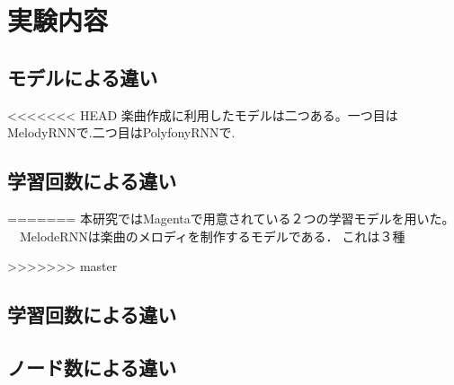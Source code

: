 \chapter{実験内容}
\section{モデルによる違い}
<<<<<<< HEAD
楽曲作成に利用したモデルは二つある。一つ目はMelodyRNNで.二つ目はPolyfonyRNNで.
\section{学習回数による違い}
=======
本研究ではMagentaで用意されている２つの学習モデルを用いた。
　MelodeRNNは楽曲のメロディを制作するモデルである．これは３種


>>>>>>> master




\section{学習回数による違い}
\section{ノード数による違い}